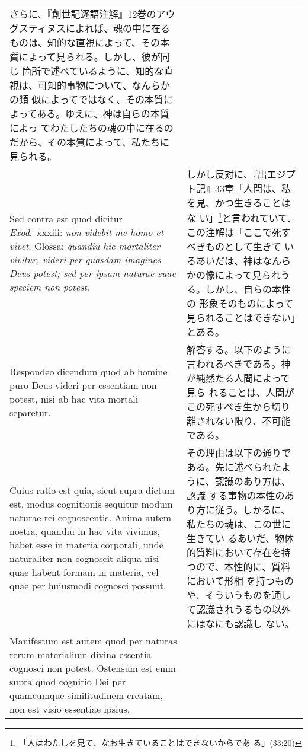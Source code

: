 \documentclass[10pt]{jsarticle} %
\begin{document}
\begin{longtable}{p{21em}p{21em}}
さらに、『創世記逐語注解』12巻のアウグスティヌスによれば、魂の中に在る
ものは、知的な直視によって、その本質によって見られる。しかし、彼が同じ
箇所で述べているように、知的な直視は、可知的事物について、なんらかの類
似によってではなく、その本質によってある。ゆえに、神は自らの本質によっ
てわたしたちの魂の中に在るのだから、その本質によって、私たちに見られる。

\\

{\sc Sed contra est} quod dicitur {\it Exod}.~{\sc xxxiii}: {\it non
videbit me homo et vivet}. Glossa: {\it quandiu hic mortaliter
vivitur, videri per quasdam imagines Deus potest; sed per ipsam
naturae suae speciem non potest}.

&

しかし反対に、『出エジプト記』33章「人間は、私を見、かつ生きることはな
い」\footnote{「人はわたしを見て、なお生きていることはできないからであ
る」(33:20)}と言われていて、この注解は「ここで死すべきものとして生きて
いるあいだは、神はなんらかの像によって見られうる。しかし、自らの本性の
形象そのものによって見られることはできない」とある。

\\

{\sc Respondeo dicendum} quod ab homine puro Deus videri per essentiam
non potest, nisi ab hac vita mortali separetur. 

&

解答する。以下のように言われるべきである。神が純然たる人間によって見ら
れることは、人間がこの死すべき生から切り離されない限り、不可能である。

\\

Cuius ratio est quia, sicut supra dictum est, modus cognitionis
sequitur modum naturae rei cognoscentis.  Anima autem nostra, quandiu
in hac vita vivimus, habet esse in materia corporali, unde naturaliter
non cognoscit aliqua nisi quae habent formam in materia, vel quae per
huiusmodi cognosci possunt.

&

その理由は以下の通りである。先に述べられたように、認識のあり方は、認識
する事物の本性のあり方に従う。しかるに、私たちの魂は、この世に生きてい
るあいだ、物体的質料において存在を持つので、本性的に、質料において形相
を持つものや、そういうものを通して認識されうるもの以外にはなにも認識し
ない。

\\

Manifestum est autem quod per naturas rerum materialium divina
essentia cognosci non potest. Ostensum est enim supra quod cognitio
Dei per quamcumque similitudinem creatam, non est visio essentiae
ipsius.


\end{longtable}
\end{document}
